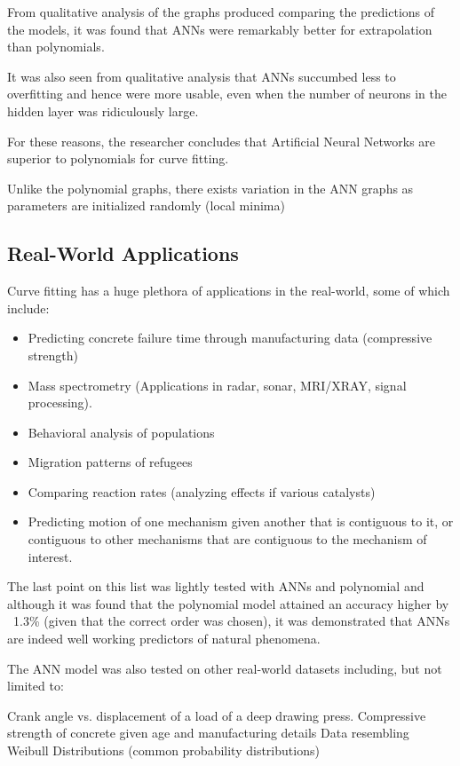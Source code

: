 \documentclass{article}
\begin{document}
From qualitative analysis of the graphs produced comparing the predictions of the models, it was found that ANNs were remarkably better for extrapolation than polynomials.

It was also seen from qualitative analysis that ANNs succumbed less to overfitting and hence were more usable, even when the number of neurons in the hidden layer was ridiculously large.

For these reasons, the researcher concludes that Artificial Neural Networks are superior to polynomials for curve fitting.


Unlike the polynomial graphs, there exists variation in the ANN graphs as parameters are initialized randomly (local minima)

\subsection{Real-World Applications}
Curve fitting has a huge plethora of applications in the real-world, some of which include:

\begin{itemize}
    \item Predicting concrete failure time through manufacturing data (compressive strength)
    \item Mass spectrometry (Applications in radar, sonar, MRI/XRAY, signal processing).
    \item Behavioral analysis of populations
    \item Migration patterns of refugees
    \item Comparing reaction rates (analyzing effects if various catalysts)
    \item Predicting motion of one mechanism given another that is contiguous to it, or contiguous to other mechanisms that are contiguous to the mechanism of interest.
\end{itemize}

The last point on this list was lightly tested with ANNs and polynomial and although it was found that the polynomial model attained an accuracy higher by ~1.3\% (given that the correct order was chosen), it was demonstrated that ANNs are indeed well working predictors of natural phenomena.

The ANN model was also tested on other real-world datasets including, but not limited to:

Crank angle vs. displacement of a load of a deep drawing press.
Compressive strength of concrete given age and manufacturing details
Data resembling Weibull Distributions (common probability distributions)
\end{document}
